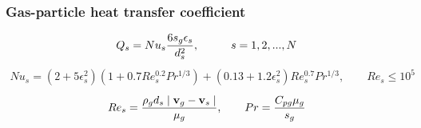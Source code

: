 \subsubsection{\hspace{1cm}Gas-particle heat transfer coefficient}

%
\begin{eqnarray}
Q_{s}=Nu_{s}\frac{6s_{g}\epsilon_{s}}{d_{s}^{2}},
\hspace{10mm} s = 1,2,...,N
\label{eq:heattr}
\end{eqnarray}
%
\begin{eqnarray}
Nu_{s} = (2 + 5 \epsilon_s^2)(1+0.7Re_{s}^{0.2}Pr^{1/3})+
(0.13+1.2\epsilon_s^2)Re_s^{0.7}Pr^{1/3}, 
\qquad Re_{s} \leq 10^5
\label{eq:nusselt}
\end{eqnarray}
%
\begin{eqnarray}
Re_{s}=\frac{\rho_{g}d_{s}\mid{\bf v}_{g}-{\bf v}_{s}\mid}{\mu_{g}},
\qquad Pr=\frac{C_{pg}\mu_{g}}{s_g}
\label{eq:reypr}
\end{eqnarray}
%

\clearpage
